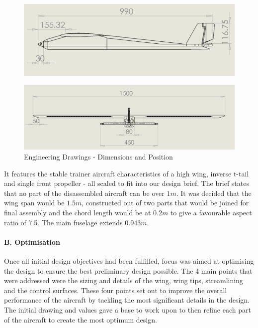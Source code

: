 \documentclass[12pt]{article}
\begin{document}
\begin{figure}[h!]
    \includegraphics[width=14.5cm, scale=1]{drawing2.png}
\end{figure}

\begin{figure}[h!]
    \includegraphics[width=14.5cm, scale=1]{drawing3.png}
    \caption{Engineering Drawings - Dimensions and Position}
\end{figure}

\noindent It features the stable trainer aircraft characteristics of a high wing, inverse t-tail and single front propeller - all scaled to fit into our design brief. The brief states that no part of the disassembled aircraft can be over $1m$. It was decided that the wing span would be $1.5 m$, constructed out of two parts that would be joined for final assembly and the chord length would be at $0.2m$ to give a favourable aspect ratio of 7.5. The main fuselage extends $0.943m$. \\

\paragraph{B. Optimisation} Once all initial design objectives had been fulfilled, focus was aimed at optimising the design to ensure the best preliminary design possible. The 4 main points that were addressed were the sizing and details of the wing, wing tips, streamlining and the control surfaces. These four points set out to improve the overall performance of the aircraft by tackling the most significant details in the design. The initial drawing and values gave a base to work upon to then refine each part of the aircraft to create the most optimum design. \\
\end{document}
